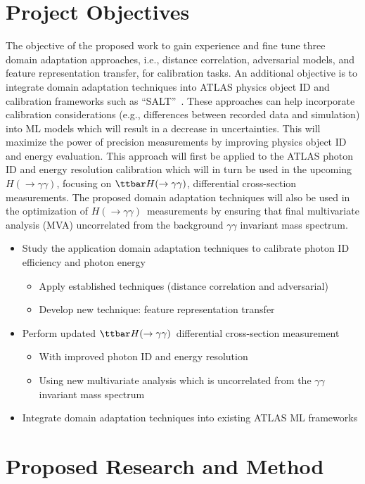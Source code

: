 \documentclass[letter, USenglish, 11pt, subfigure]{article}
\newcommand{\tthyy}{\ensuremath{\ttbar H(\to\gamma\gamma)}}
\newcommand{\hyy}{\ensuremath{H(\to\gamma\gamma)}}
\begin{document}
\section{Project Objectives}
The objective of the proposed work to gain experience and fine tune three domain adaptation approaches, i.e., distance correlation, adversarial models, and feature representation transfer, for calibration tasks. An additional objective is to integrate domain adaptation techniques into ATLAS physics object ID and calibration frameworks such as ``SALT''~\cite{salt}. These approaches can help incorporate calibration considerations (e.g., differences between recorded data and simulation) into ML models which will result in a decrease in uncertainties. This will maximize the power of precision measurements by improving physics object ID and energy evaluation. This approach will first be applied to the ATLAS photon ID and energy resolution calibration which will in turn be used in the upcoming \hyy, focusing on \tthyy, differential cross-section measurements. The proposed domain adaptation techniques will also be used in the optimization of \hyy\ measurements by ensuring that final multivariate analysis (MVA) uncorrelated from the background $\gamma\gamma$ invariant mass spectrum. 

\begin{itemize}
\item Study the application domain adaptation techniques to calibrate photon ID efficiency and photon energy
  \begin{itemize}
  \item Apply established techniques (distance correlation and adversarial)
  \item Develop new technique: feature representation transfer
  \end{itemize}
\item Perform updated \tthyy\ differential cross-section measurement
  \begin{itemize}
  \item With improved photon ID and energy resolution
  \item Using new multivariate analysis which is uncorrelated from the $\gamma\gamma$ invariant mass spectrum
  \end{itemize}
\item Integrate domain adaptation techniques into existing ATLAS ML frameworks
\end{itemize}
\clearpage
\section{Proposed Research and Method}
\end{document}

